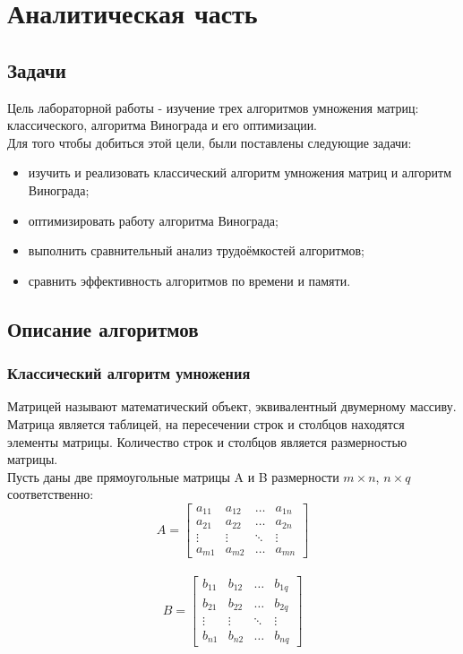 \documentclass[12pt, a4paper]{report}
\begin{document}
    \chapter{Аналитическая часть}
	\section{Задачи}
	Цель лабораторной работы - изучение трех алгоритмов умножения матриц: классического, алгоритма Винограда и его оптимизации.\\
	Для того чтобы добиться этой цели, были поставлены следующие задачи:
	\begin{itemize}
		\item изучить и реализовать классический алгоритм умножения матриц и алгоритм Винограда;
		\item оптимизировать работу алгоритма Винограда;
		\item выполнить сравнительный анализ трудоёмкостей алгоритмов;
		\item сравнить эффективность алгоритмов по времени и памяти.
	\end{itemize}

	\section{Описание алгоритмов}
	
	\subsection{Классический алгоритм умножения}
	Матрицей называют математический объект, эквивалентный двумерному массиву. Матрица является таблицей, на пересечении строк и столбцов находятся элементы матрицы. Количество строк и столбцов является размерностью матрицы.\\
	Пусть даны две прямоугольные матрицы A и B размерности $m \times n$, $n \times q$
	соответственно:\\
	$$A =  \begin{bmatrix} 
	a_{11}& a_{12} &\ldots & a_{1n}\\ 
	a_{21}& a_{22} &\ldots & a_{2n}\\ 
	\vdots& \vdots &\ddots & \vdots\\ 
	a_{m1}& a_{m2} &\ldots & a_{mn} 
	\end{bmatrix} $$\\	
	
	$$B = \begin{bmatrix} 
	b_{11}& b_{12} &\ldots & b_{1q}\\ 
	b_{21}& b_{22} &\ldots & b_{2q}\\ 
	\vdots& \vdots &\ddots & \vdots\\ 
	b_{n1}& b_{n2} &\ldots & b_{nq} 
	\end{bmatrix} $$\\
	
\end{document}
